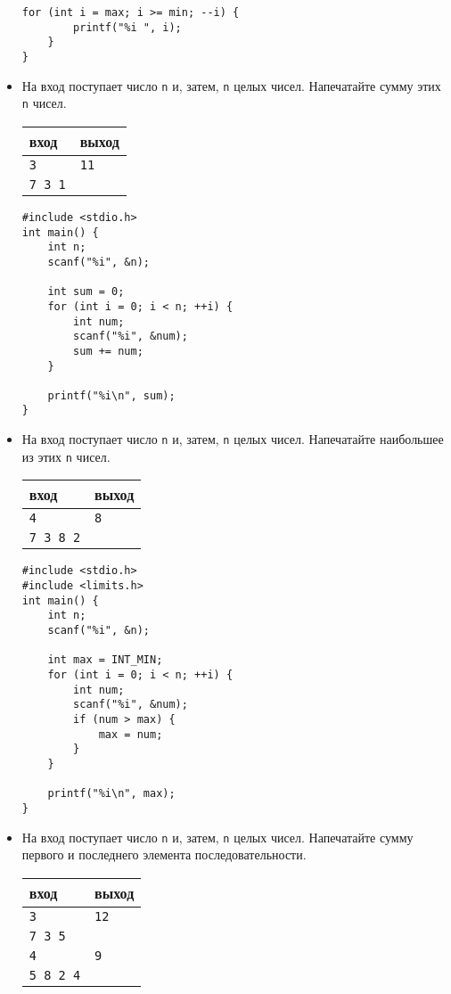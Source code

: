 \documentclass{article}
\begin{document}
\begin{itemize}
\begin{lstlisting}[backgroundcolor = \color{solcolor}]
    for (int i = max; i >= min; --i) {
        printf("%i ", i);
    }
}
\end{lstlisting}
\item На вход поступает число \texttt{n} и, затем, \texttt{n} целых чисел. Напечатайте сумму этих \texttt{n} чисел.
\begin{center}
\begin{tabular}{ l | l }
 вход & выход \\ \hline
 \texttt{3} & \texttt{11}  \\ 
 \texttt{7 3 1} &  \\ 
\end{tabular}
\end{center}

\begin{lstlisting}[backgroundcolor = \color{solcolor}]
#include <stdio.h>
int main() {
    int n; 
    scanf("%i", &n);
    
    int sum = 0;
    for (int i = 0; i < n; ++i) {
        int num;
        scanf("%i", &num);
        sum += num;
    }
    
    printf("%i\n", sum);
}
\end{lstlisting}

\newpage
\item На вход поступает число \texttt{n} и, затем, \texttt{n} целых чисел. Напечатайте наибольшее из этих \texttt{n} чисел.
\begin{center}
\begin{tabular}{ l | l }
 вход & выход \\ \hline
 \texttt{4} & \texttt{8}  \\ 
 \texttt{7 3 8 2} &  \\ 
\end{tabular}
\end{center}

\begin{lstlisting}[backgroundcolor = \color{solcolor}]
#include <stdio.h>
#include <limits.h>
int main() {
    int n; 
    scanf("%i", &n);
    
    int max = INT_MIN;
    for (int i = 0; i < n; ++i) {
        int num;
        scanf("%i", &num);
        if (num > max) {
            max = num;
        }
    }
    
    printf("%i\n", max);
}
\end{lstlisting}

\item На вход поступает число \texttt{n} и, затем, \texttt{n} целых чисел. Напечатайте сумму первого и последнего элемента последовательности.
\begin{center}
\begin{tabular}{ l | l }
 вход & выход \\ \hline
 \texttt{3} & \texttt{12}  \\ 
 \texttt{7 3 5} &  \\ \hline
 \texttt{4} & \texttt{9}  \\ 
 \texttt{5 8 2 4} &  \\
\end{tabular}
\end{center}


\end{itemize}
\end{document}
